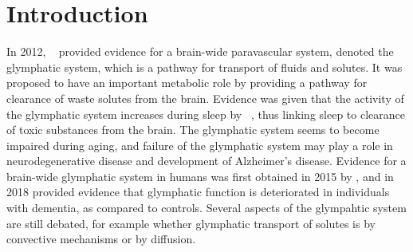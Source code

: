 \documentclass[12pt,a4paper]{article}
\begin{document}
\section{Introduction}
In 2012, ~\citet{iliff2012paravascular} provided evidence for a brain-wide paravascular system, denoted the glymphatic system, which is a pathway for transport of fluids and solutes. It was proposed to have an important metabolic role by providing a pathway for clearance of waste solutes from the brain. Evidence was given that the activity of the glymphatic system increases during  sleep by ~\citet{xie2013sleep}, thus linking sleep to clearance of toxic substances from the brain. The glymphatic system seems to become impaired during aging, and failure of the glymphatic system may play a role in neurodegenerative disease and development of Alzheimer's disease. Evidence for a brain-wide glymphatic system in humans was first obtained in 2015 by \citet{eide2015mri}, and in 2018 \citet{ringstad2018brain} provided evidence that glymphatic function is deteriorated in individuals with dementia, as compared to controls.
Several aspects of the glympahtic system are still debated, for example whether glymphatic transport of solutes is by convective mechanisms or by diffusion.

\end{document}
